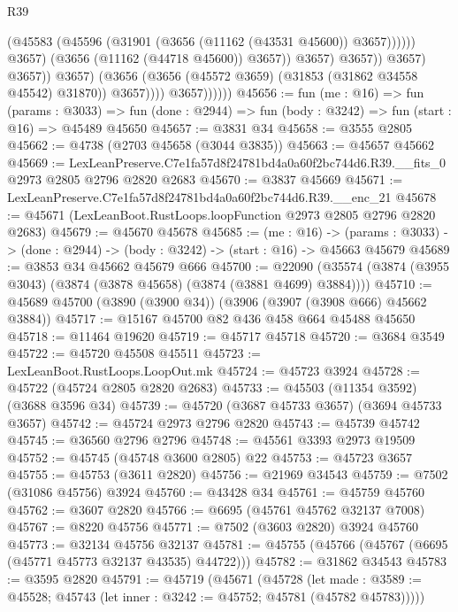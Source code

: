 \begin{lexlean}{R39}
\begin{coremodule}
                                            (@45583
                                              (@45596
                                                (@31901 (@3656 (@11162 (@43531 @45600)) @3657))))))
                                        @3657)
                                      (@3656 (@11162 (@44718 @45600)) @3657))
                                    @3657)
                                  @3657))
                              @3657)
                            @3657))
                        @3657)
                      (@3656 (@3656 (@45572 @3659) (@31853 (@31862 @34558 @45542) @31870)) @3657))))
                @3657))))))
@45656 := fun (me : @16) =>
  fun (params : @3033) =>
  fun (done : @2944) => fun (body : @3242) => fun (start : @16) => @45489 @45650
@45657 := @3831 @34
@45658 := @3555 @2805
@45662 := @4738 (@2703 @45658 (@3044 @3835))
@45663 := @45657 @45662
@45669 := LexLeanPreserve.C7e1fa57d8f24781bd4a0a60f2bc744d6.R39.__fits_0
    @2973
    @2805
    @2796
    @2820
    @2683
@45670 := @3837 @45669
@45671 := LexLeanPreserve.C7e1fa57d8f24781bd4a0a60f2bc744d6.R39.__enc_21
@45678 := @45671 (LexLeanBoot.RustLoops.loopFunction @2973 @2805 @2796 @2820 @2683)
@45679 := @45670 @45678
@45685 := (me : @16) ->
  (params : @3033) -> (done : @2944) -> (body : @3242) -> (start : @16) -> @45663 @45679
@45689 := @3853 @34 @45662 @45679 @666
@45700 := @22090 (@35574 (@3874 (@3955 @3043) (@3874 (@3878 @45658) (@3874 (@3881 @4699) @3884))))
@45710 := @45689 @45700 (@3890 (@3900 @34)) (@3906 (@3907 (@3908 @666) @45662 @3884))
@45717 := @15167 @45700 @82 @436 @458 @664 @45488 @45650
@45718 := @11464 @19620
@45719 := @45717 @45718
@45720 := @3684 @3549
@45722 := @45720 @45508 @45511
@45723 := LexLeanBoot.RustLoops.LoopOut.mk
@45724 := @45723 @3924
@45728 := @45722 (@45724 @2805 @2820 @2683)
@45733 := @45503 (@11354 @3592) (@3688 @3596 @34)
@45739 := @45720 (@3687 @45733 @3657) (@3694 @45733 @3657)
@45742 := @45724 @2973 @2796 @2820
@45743 := @45739 @45742
@45745 := @36560 @2796 @2796
@45748 := @45561 @3393 @2973 @19509
@45752 := @45745 (@45748 @3600 @2805) @22
@45753 := @45723 @3657
@45755 := @45753 (@3611 @2820)
@45756 := @21969 @34543
@45759 := @7502 (@31086 @45756) @3924
@45760 := @43428 @34
@45761 := @45759 @45760
@45762 := @3607 @2820
@45766 := @6695 (@45761 @45762 @32137 @7008)
@45767 := @8220 @45756
@45771 := @7502 (@3603 @2820) @3924 @45760
@45773 := @32134 @45756 @32137
@45781 := @45755 (@45766 (@45767 (@6695 (@45771 @45773 @32137 @43535) @44722)))
@45782 := @31862 @34543
@45783 := @3595 @2820
@45791 := @45719
    (@45671
      (@45728
        (let made : @3589 := @45528; @45743 (let inner : @3242 := @45752; @45781 (@45782 @45783)))))

\end{coremodule}
\end{lexlean}
